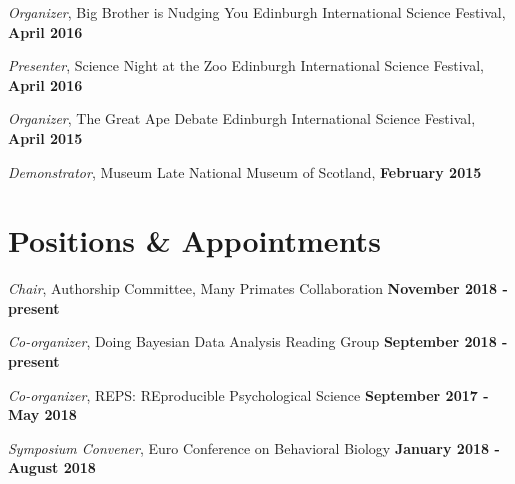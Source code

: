 \documentclass[margin,line]{res}
\begin{document}
\begin{resume}
\vspace{-.2cm}
{\em Organizer}, Big Brother is Nudging You \hfill  Edinburgh International Science Festival,  {\bf April 2016}\\
\vspace{-.5cm}

\vspace{-.2cm}
{\em Presenter}, Science Night at the Zoo \hfill  Edinburgh International Science Festival,  {\bf April 2016}\\
\vspace{-.5cm}

\vspace{-.2cm}
{\em Organizer}, The Great Ape Debate \hfill  Edinburgh International Science Festival,  {\bf April 2015}\\
\vspace{-.5cm}

\vspace{-.2cm}
{\em Demonstrator}, Museum Late  \hfill  National Museum of Scotland,  {\bf February 2015}\\
\vspace{-.5cm}


\vspace{1cm}

\section{\sc Positions \& Appointments} 


\vspace{-.2cm}
{\em Chair}, Authorship Committee, Many Primates Collaboration \hfill   {\bf November 2018 - present}\\
\vspace{-.5cm}

\vspace{-.2cm}
{\em Co-organizer}, Doing Bayesian Data Analysis Reading Group \hfill   {\bf September 2018 - present}\\
\vspace{-.5cm}

\vspace{-.2cm}
{\em Co-organizer}, REPS: REproducible Psychological Science \hfill   {\bf September 2017 - May 2018}\\
\vspace{-.5cm}

\vspace{-.2cm}
{\em Symposium Convener}, Euro Conference on Behavioral Biology \hfill  {\bf January 2018 - August 2018}\\
\vspace{-.5cm}


\end{resume}
\end{document}
